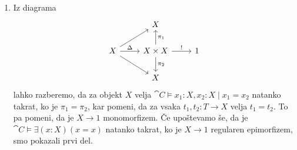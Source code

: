 \documentclass[../kategoricna_logika.tex]{subfiles}
\begin{document}
  \begin{dokaz}
    \begin{enumerate}[label=(\roman*)]
    \item Iz diagrama
      \begin{equation*}
        \begin{tikzcd}[row sep=normal]
          & X & \\
          X \ar[ur] \ar[r, "\Delta"] \ar[dr] & X \times X \ar[u, "\pi_1"'] \ar[d, "\pi_2"] \ar[r, "!"] & 1 \\
          & X &
        \end{tikzcd}
      \end{equation*}
      lahko razberemo, da za objekt $X$ velja
      $\cat{C} \models x_1:X,x_2:X \mid x_1 = x_2$ natanko takrat, ko je
      $\pi_1 = \pi_2$, kar pomeni, da za vsaka $t_1,t_2:T \to X$ velja
      $t_1 = t_2$. To pa pomeni, da je $X \to 1$ monomorfizem.
      Če upoštevamo
      še, da je $\cat{C} \models \exists (x:X) (x = x)$ natanko takrat, ko
      je $X \to 1$ regularen epimorfizem, smo pokazali prvi del.
      

\end{enumerate}
\end{dokaz}
\end{document}
